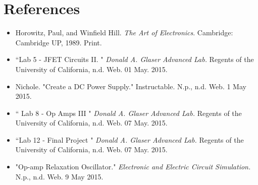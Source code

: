 \documentclass[authoryear, 12pt,5p, times]{elsarticle}
\begin{document}
  \section*{References}
 \begin{footnotesize}
 \begin{itemize}
 \setlength\itemsep{0.001em}
 \item Horowitz, Paul, and Winfield Hill. \textit{The Art of Electronics}. Cambridge: Cambridge UP, 1989. Print.
 \item ``Lab 5 - JFET Circuits II. " \textit{Donald A. Glaser Advanced Lab.} Regents of the University of California, n.d. Web. 01 May. 2015.
 \item Nichole. "Create a DC Power Supply." Instructable. N.p., n.d. Web. 1 May 2015.
  \item `` Lab 8 - Op Amps III " \textit{Donald A. Glaser Advanced Lab.} Regents of the University of California, n.d. Web. 07 May. 2015.
  \item ``Lab 12 - Final Project " \textit{Donald A. Glaser Advanced Lab.} Regents of the University of California, n.d. Web. 07 May. 2015.
 \item "Op-amp Relaxation Oscillator." \textit{Electronic and Electric Circuit Simulation.} N.p., n.d. Web. 9 May 2015.
 \end{itemize} 
  \end{footnotesize}
\end{document}
